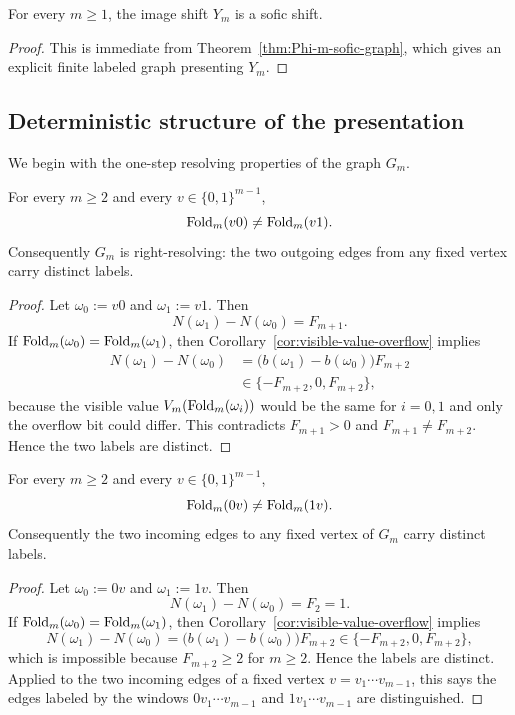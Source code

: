\begin{corollary}
\label{prop:Y-m-sofic}
For every $m\ge 1$, the image shift $Y_m$ is a sofic shift.
\end{corollary}

\begin{proof}
This is immediate from Theorem~\ref{thm:Phi-m-sofic-graph}, which gives an
explicit finite labeled graph presenting $Y_m$.
\end{proof}

\subsection{Deterministic structure of the presentation}

We begin with the one-step resolving properties of the graph $G_m$.

\begin{proposition}
\label{prop:one-step-right-resolving}
For every $m\ge 2$ and every $v\in\{0,1\}^{m-1}$,
\[
\operatorname{Fold}_m(v0)\neq \operatorname{Fold}_m(v1).
\]
Consequently $G_m$ is right-resolving: the two outgoing edges from any fixed
vertex carry distinct labels.
\end{proposition}

\begin{proof}
Let $\omega_0:=v0$ and $\omega_1:=v1$.  Then
\[
N(\omega_1)-N(\omega_0)=F_{m+1}.
\]
If $\operatorname{Fold}_m(\omega_0)=\operatorname{Fold}_m(\omega_1)$, then
Corollary~\ref{cor:visible-value-overflow} implies
\[
\begin{aligned}
N(\omega_1)-N(\omega_0)
&=
\bigl(b(\omega_1)-b(\omega_0)\bigr)F_{m+2}\\
&\in\{-F_{m+2},0,F_{m+2}\},
\end{aligned}
\]
because the visible value $V_m(\operatorname{Fold}_m(\omega_i))$ would be the same for
$i=0,1$ and only the overflow bit could differ.  This contradicts
$F_{m+1}>0$ and $F_{m+1}\neq F_{m+2}$.  Hence the two labels are distinct.
\end{proof}

\begin{proposition}
\label{prop:one-step-left-resolving}
For every $m\ge 2$ and every $v\in\{0,1\}^{m-1}$,
\[
\operatorname{Fold}_m(0v)\neq \operatorname{Fold}_m(1v).
\]
Consequently the two incoming edges to any fixed vertex of $G_m$ carry
distinct labels.
\end{proposition}

\begin{proof}
Let $\omega_0:=0v$ and $\omega_1:=1v$.  Then
\[
N(\omega_1)-N(\omega_0)=F_2=1.
\]
If $\operatorname{Fold}_m(\omega_0)=\operatorname{Fold}_m(\omega_1)$, then
Corollary~\ref{cor:visible-value-overflow} implies
\[
N(\omega_1)-N(\omega_0)
=
\bigl(b(\omega_1)-b(\omega_0)\bigr)F_{m+2}
\in\{-F_{m+2},0,F_{m+2}\},
\]
which is impossible because $F_{m+2}\ge 2$ for $m\ge 2$.  Hence the labels are
distinct.  Applied to the two incoming edges of a fixed vertex
$v=v_1\cdots v_{m-1}$, this says the edges labeled by the windows
$0v_1\cdots v_{m-1}$ and $1v_1\cdots v_{m-1}$ are distinguished.
\end{proof}

